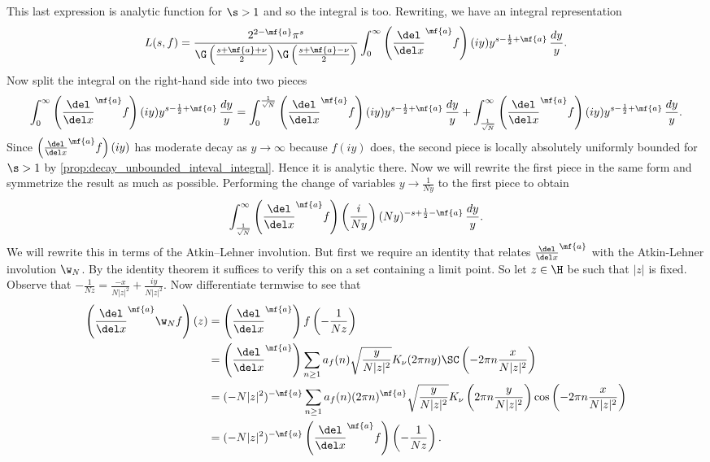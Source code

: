       This last expression is analytic function for $\s > 1$ and so the integral is too. Rewriting, we have an integral representation
      \begin{equation}\label{equ:integral_representation_Maass_1}
        L(s,f) = \frac{2^{2-\mf{a}}\pi^{s}}{\G\left(\frac{s+\mf{a}+\nu}{2}\right)\G\left(\frac{s+\mf{a}-\nu}{2}\right)}\int_{0}^{\infty}\left(\frac{\del}{\del x}^{\mf{a}}f\right)(iy)y^{s-\frac{1}{2}+\mf{a}}\,\frac{dy}{y}.
      \end{equation}
      Now split the integral on the right-hand side into two pieces
      \begin{equation}\label{equ:symmetric_integral_Maass_split}
        \int_{0}^{\infty}\left(\frac{\del}{\del x}^{\mf{a}}f\right)(iy)y^{s-\frac{1}{2}+\mf{a}}\,\frac{dy}{y} = \int_{0}^{\frac{1}{\sqrt{N}}}\left(\frac{\del}{\del x}^{\mf{a}}f\right)(iy)y^{s-\frac{1}{2}+\mf{a}}\,\frac{dy}{y}+\int_{\frac{1}{\sqrt{N}}}^{\infty}\left(\frac{\del}{\del x}^{\mf{a}}f\right)(iy)y^{s-\frac{1}{2}+\mf{a}}\,\frac{dy}{y}.
      \end{equation}
      Since $\left(\frac{\del}{\del x}^{\mf{a}}f\right)(iy)$ has moderate decay as $y \to \infty$ because $f(iy)$ does, the second piece is locally absolutely uniformly bounded for $\s > 1$ by \cref{prop:decay_unbounded_inteval_integral}. Hence it is analytic there. Now we will rewrite the first piece in the same form and symmetrize the result as much as possible. Performing the change of variables $y \to \frac{1}{Ny}$ to the first piece to obtain
      \[
        \int_{\frac{1}{\sqrt{N}}}^{\infty}\left(\frac{\del}{\del x}^{\mf{a}}f\right)\left(\frac{i}{Ny}\right)(Ny)^{-s+\frac{1}{2}-\mf{a}}\,\frac{dy}{y}.
      \]
      We will rewrite this in terms of the Atkin–Lehner involution. But first we require an identity that relates $\frac{\del}{\del x}^{\mf{a}}$ with the Atkin-Lehner involution $\w_{N}$. By the identity theorem it suffices to verify this on a set containing a limit point. So let $z \in \H$ be such that $|z|$ is fixed. Observe that $-\frac{1}{Nz} = \frac{-x}{N|z|^{2}}+\frac{iy}{N|z|^{2}}$. Now differentiate termwise to see that
      \begin{align*}
        \left(\frac{\del}{\del x}^{\mf{a}}\w_{N}f\right)(z) &= \left(\frac{\del}{\del x}^{\mf{a}}\right)f\left(-\frac{1}{Nz}\right) \\
         &= \left(\frac{\del}{\del x}^{\mf{a}}\right)\sum_{n \ge 1}a_{f}(n)\sqrt{\frac{y}{N|z|^{2}}}K_{\nu}(2\pi ny)\SC\left(-2\pi n\frac{x}{N|z|^{2}}\right) \\
        &= (-N|z|^{2})^{-\mf{a}}\sum_{n \ge 1}a_{f}(n)(2\pi n)^{\mf{a}}\sqrt{\frac{y}{N|z|^{2}}}K_{\nu}\left(2\pi n\frac{y}{N|z|^{2}}\right)\cos\left(-2\pi n\frac{x}{N|z|^{2}}\right) \\
        &= (-N|z|^{2})^{-\mf{a}}\left(\frac{\del}{\del x}^{\mf{a}}f\right)\left(-\frac{1}{Nz}\right).
      \end{align*}
